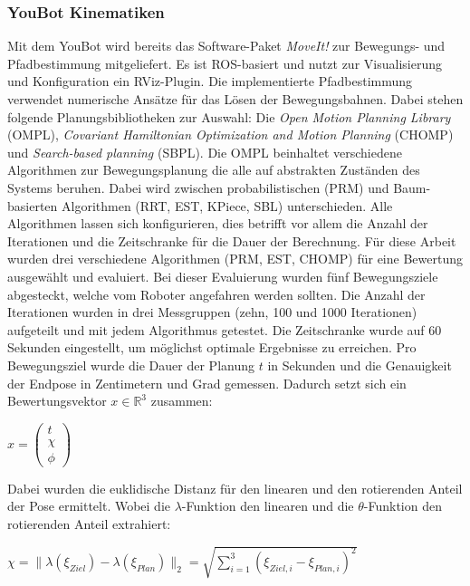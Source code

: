 \subsubsection{YouBot Kinematiken}
Mit dem YouBot wird bereits das Software-Paket \textit{MoveIt!} zur Bewegungs- und Pfadbestimmung mitgeliefert. Es ist ROS-basiert und nutzt zur Visualisierung und Konfiguration ein RViz-Plugin. Die implementierte Pfadbestimmung verwendet numerische Ansätze für das Lösen der Bewegungsbahnen. Dabei stehen folgende Planungsbibliotheken zur Auswahl: Die \textit{Open Motion Planning Library} (OMPL), \textit{Covariant Hamiltonian Optimization and Motion Planning} (CHOMP) und \textit{Search-based planning} (SBPL). Die OMPL beinhaltet verschiedene Algorithmen zur Bewegungsplanung die alle auf abstrakten Zuständen des Systems beruhen. Dabei wird zwischen probabilistischen (PRM) und Baum-basierten Algorithmen (RRT, EST, KPiece, SBL) unterschieden. Alle Algorithmen lassen sich konfigurieren, dies betrifft vor allem die Anzahl der Iterationen und die Zeitschranke für die Dauer der Berechnung. Für diese Arbeit wurden drei verschiedene Algorithmen (PRM, EST, CHOMP) für eine Bewertung ausgewählt und evaluiert. Bei dieser Evaluierung wurden fünf Bewegungsziele abgesteckt, welche vom Roboter angefahren werden sollten. Die Anzahl der Iterationen wurden in drei Messgruppen (zehn, 100 und 1000 Iterationen) aufgeteilt und mit jedem Algorithmus getestet. Die Zeitschranke wurde auf 60 Sekunden eingestellt, um möglichst optimale Ergebnisse zu erreichen. Pro Bewegungsziel wurde die Dauer der Planung $t$ in Sekunden und die Genauigkeit der Endpose in Zentimetern und Grad gemessen. Dadurch setzt sich ein Bewertungsvektor $x \in  \mathbb{R}^3$ zusammen:

\begin{math}
	x = \left(\begin{array}{c} t \\ \chi \\ \phi \end{array}\right)	
\end{math}

Dabei wurden die euklidische Distanz für den linearen und den rotierenden Anteil der Pose ermittelt. Wobei die $\lambda$-Funktion den linearen und die $\theta$-Funktion den rotierenden Anteil extrahiert: 

\begin{math}
	\chi = \|\lambda(\xi_{Ziel}) - \lambda(\xi_{Plan})\|_2 = \sqrt{\sum_{i=1}^{3}(\xi_{Ziel,i}-\xi_{Plan,i})^2}	
\end{math}

